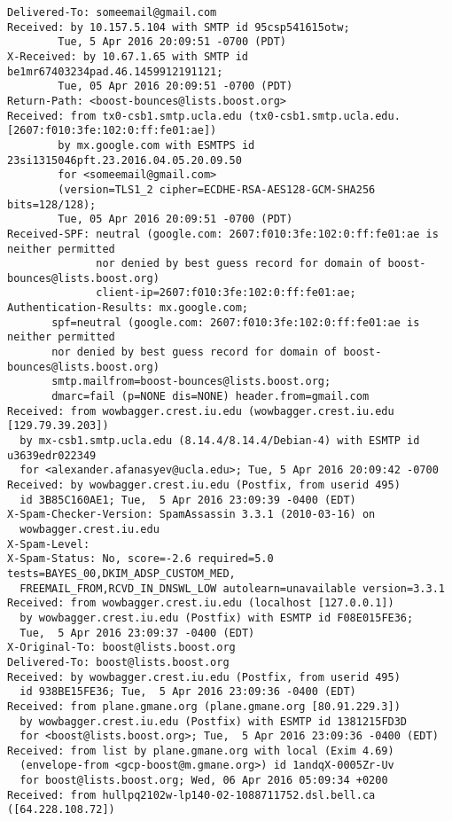 \documentclass{report}
\begin{document}
\begin{problem}
{\small
\begin{lstlisting}
Delivered-To: someemail@gmail.com
Received: by 10.157.5.104 with SMTP id 95csp541615otw;
        Tue, 5 Apr 2016 20:09:51 -0700 (PDT)
X-Received: by 10.67.1.65 with SMTP id be1mr67403234pad.46.1459912191121;
        Tue, 05 Apr 2016 20:09:51 -0700 (PDT)
Return-Path: <boost-bounces@lists.boost.org>
Received: from tx0-csb1.smtp.ucla.edu (tx0-csb1.smtp.ucla.edu. [2607:f010:3fe:102:0:ff:fe01:ae])
        by mx.google.com with ESMTPS id 23si1315046pft.23.2016.04.05.20.09.50
        for <someemail@gmail.com>
        (version=TLS1_2 cipher=ECDHE-RSA-AES128-GCM-SHA256 bits=128/128);
        Tue, 05 Apr 2016 20:09:51 -0700 (PDT)
Received-SPF: neutral (google.com: 2607:f010:3fe:102:0:ff:fe01:ae is neither permitted
              nor denied by best guess record for domain of boost-bounces@lists.boost.org) 
              client-ip=2607:f010:3fe:102:0:ff:fe01:ae;
Authentication-Results: mx.google.com;
       spf=neutral (google.com: 2607:f010:3fe:102:0:ff:fe01:ae is neither permitted 
       nor denied by best guess record for domain of boost-bounces@lists.boost.org) 
       smtp.mailfrom=boost-bounces@lists.boost.org;
       dmarc=fail (p=NONE dis=NONE) header.from=gmail.com
Received: from wowbagger.crest.iu.edu (wowbagger.crest.iu.edu [129.79.39.203])
  by mx-csb1.smtp.ucla.edu (8.14.4/8.14.4/Debian-4) with ESMTP id u3639edr022349
  for <alexander.afanasyev@ucla.edu>; Tue, 5 Apr 2016 20:09:42 -0700
Received: by wowbagger.crest.iu.edu (Postfix, from userid 495)
  id 3B85C160AE1; Tue,  5 Apr 2016 23:09:39 -0400 (EDT)
X-Spam-Checker-Version: SpamAssassin 3.3.1 (2010-03-16) on
  wowbagger.crest.iu.edu
X-Spam-Level:
X-Spam-Status: No, score=-2.6 required=5.0 tests=BAYES_00,DKIM_ADSP_CUSTOM_MED,
  FREEMAIL_FROM,RCVD_IN_DNSWL_LOW autolearn=unavailable version=3.3.1
Received: from wowbagger.crest.iu.edu (localhost [127.0.0.1])
  by wowbagger.crest.iu.edu (Postfix) with ESMTP id F08E015FE36;
  Tue,  5 Apr 2016 23:09:37 -0400 (EDT)
X-Original-To: boost@lists.boost.org
Delivered-To: boost@lists.boost.org
Received: by wowbagger.crest.iu.edu (Postfix, from userid 495)
  id 938BE15FE36; Tue,  5 Apr 2016 23:09:36 -0400 (EDT)
Received: from plane.gmane.org (plane.gmane.org [80.91.229.3])
  by wowbagger.crest.iu.edu (Postfix) with ESMTP id 1381215FD3D
  for <boost@lists.boost.org>; Tue,  5 Apr 2016 23:09:36 -0400 (EDT)
Received: from list by plane.gmane.org with local (Exim 4.69)
  (envelope-from <gcp-boost@m.gmane.org>) id 1andqX-0005Zr-Uv
  for boost@lists.boost.org; Wed, 06 Apr 2016 05:09:34 +0200
Received: from hullpq2102w-lp140-02-1088711752.dsl.bell.ca ([64.228.108.72])

\end{lstlisting}}
\end{problem}
\end{document}
